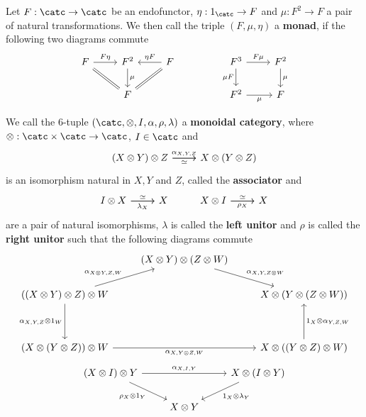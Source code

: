 \begin{definition}
	Let $F : \catc \to \catc $ be an endofunctor, $\eta : 1_{\catc} \to F$ and 
	$\mu : F^2 \to F$ a pair of natural transformations. We then call the triple
	$(F,\mu,\eta)$ a \textbf{monad}, if the following two diagrams commute
	\[\begin{tikzcd}
	F & {F^2} & F && {F^3} & {F^2} \\
	& F &&& {F^2} & F
	\arrow["{F\eta}", from=1-1, to=1-2]
	\arrow[Rightarrow, no head, from=1-1, to=2-2]
	\arrow["\mu", from=1-2, to=2-2]
	\arrow["{\eta F}"', from=1-3, to=1-2]
	\arrow[Rightarrow, no head, from=1-3, to=2-2]
	\arrow["{F\mu}", from=1-5, to=1-6]
	\arrow["{\mu F}"', from=1-5, to=2-5]
	\arrow["\mu", from=1-6, to=2-6]
	\arrow["\mu"', from=2-5, to=2-6]
\end{tikzcd}\]
\end{definition}
\begin{definition}
	We call the 6-tuple $(\catc, \otimes,I, \alpha, \rho, \lambda)$ a 
	\textbf{monoidal category}, where $\otimes: \catc\times\catc \to \catc$, $I\in\catc$ and
\[\begin{tikzcd}
	{(X\otimes Y)\otimes Z} & {X\otimes(Y\otimes Z)}
	\arrow["\simeq"', from=1-1, to=1-2]
	\arrow["{\alpha_{X,Y,Z}}", from=1-1, to=1-2]
\end{tikzcd}\]
	is an isomorphism natural in $X,Y$ and $Z$, called the \textbf{associator} and
\[\begin{tikzcd}
	{I\otimes X} & X & {X\otimes I} & X
	\arrow["\simeq", from=1-1, to=1-2]
	\arrow["{\lambda_X}"', from=1-1, to=1-2]
	\arrow["{\rho_X}"', from=1-3, to=1-4]
	\arrow["\simeq", from=1-3, to=1-4]
\end{tikzcd}\]
	are a pair of natural isomorphisms, $\lambda$ is called the \textbf{left unitor}
	and $\rho$ is called the \textbf{right unitor} such that the following diagrams commute
\[\begin{tikzcd}
	& {(X\otimes Y)\otimes(Z\otimes W)} \\
	{((X\otimes Y)\otimes Z)\otimes W} && {X\otimes(Y\otimes(Z\otimes W))} \\
	\\
	{(X\otimes(Y\otimes Z))\otimes W} && {X\otimes((Y\otimes Z)\otimes W)}
	\arrow["{\alpha_{X,Y,Z\otimes W}}", from=1-2, to=2-3]
	\arrow["{\alpha_{X\otimes Y,Z,W}}", from=2-1, to=1-2]
	\arrow["{\alpha_{X,Y,Z}\otimes 1_W}"', from=2-1, to=4-1]
	\arrow["{\alpha_{X,Y\otimes Z, W}}"', from=4-1, to=4-3]
	\arrow["{1_X\otimes\alpha_{Y,Z,W}}"', from=4-3, to=2-3]
\end{tikzcd}\]
\[\begin{tikzcd}
	{(X\otimes I) \otimes Y} && {X\otimes (I\otimes Y)} \\
	& {X\otimes Y}
	\arrow["{{\alpha_{X,I,Y}}}", from=1-1, to=1-3]
	\arrow["{{\rho_X \otimes 1_Y}}"', from=1-1, to=2-2]
	\arrow["{{1_X\otimes \lambda_Y}}", from=1-3, to=2-2]
\end{tikzcd}\]
\end{definition}

